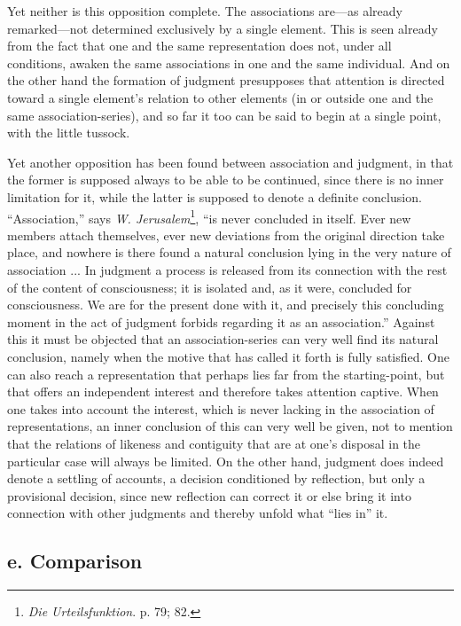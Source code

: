 \documentclass[12pt,a4paper]{book}
\newcommand{\opage}[1]{\marginnote{\footnotesize\textit{[#1]}}}
\begin{document}
Yet neither is this opposition complete. The associations are---as already
remarked---not determined exclusively by a single element. This is seen
already from the fact that one and the same representation does not, under
all conditions, awaken the same associations in one and the same
individual. And on the other hand the formation of judgment presupposes
that attention is directed toward a single element's relation to other
elements (in or outside one and the same association-series), and so far it
too can be said to begin at a single point, with the little tussock.

Yet another opposition has been found between association and judgment, in
that the former is supposed always to be able to be continued, since there
is no inner limitation for it, while the latter is supposed to denote a
definite conclusion. ``Association,'' says \emph{W.
\opage{63}Jerusalem}\footnote{\emph{Die Urteilsfunktion}. p. 79; 82.}, ``is never
concluded in itself. Ever new members attach themselves, ever new
deviations from the original direction take place, and nowhere is there
found a natural conclusion lying in the very nature of association ... In
judgment a process is released from its connection with the rest of the
content of consciousness; it is isolated and, as it were, concluded for
consciousness. We are for the present done with it, and precisely this
concluding moment in the act of judgment forbids regarding it as an
association.'' Against this it must be objected that an association-series
can very well find its natural conclusion, namely when the motive that has
called it forth is fully satisfied. One can also reach a representation that
perhaps lies far from the starting-point, but that offers an independent
interest and therefore takes attention captive. When one takes into account
the interest, which is never lacking in the association of representations,
an inner conclusion of this can very well be given, not to mention that the
relations of likeness and contiguity that are at one's disposal in the
particular case will always be limited. On the other hand, judgment does
indeed denote a settling of accounts, a decision conditioned by reflection,
but only a provisional decision, since new reflection can correct it or
else bring it into connection with other judgments and thereby unfold what
``lies in'' it.

\subsection*{e. Comparison}
\label{ssec:sammenligning}
\end{document}
